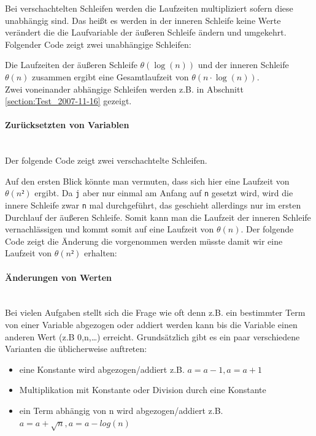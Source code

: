 \documentclass[a4paper, 12pt]{article}
\newcommand{\codeinput}[1]
{
    \begin{leftbar}
        
    \end{leftbar}
}
\begin{document}
Bei verschachtelten Schleifen werden die Laufzeiten multipliziert sofern diese
unabhängig sind. Das heißt es werden in der inneren Schleife keine Werte
verändert die die Laufvariable der äußeren Schleife ändern und umgekehrt.
Folgender Code zeigt zwei unabhängige Schleifen:

\codeinput{Independent_Loops}

Die Laufzeiten der äußeren Schleife $θ\left(\log\left(n\right)\right)$ und der
inneren Schleife $θ\left(n\right)$ zusammen ergibt eine Gesamtlaufzeit von
$θ\left( n⋅\log\left(n\right) \right)$.\\

Zwei voneinander abhängige Schleifen werden z.B. in Abschnitt
\ref{section:Test_2007-11-16} gezeigt.

\paragraph{Zurücksetzten von Variablen}~\\

Der folgende Code zeigt zwei verschachtelte Schleifen.

\codeinput{Two_Dependent_Loops}

Auf den ersten Blick könnte man vermuten, dass sich hier eine Laufzeit von
$θ\left(n²\right)$ ergibt. Da \texttt{j} aber nur einmal am Anfang auf
\texttt{n} gesetzt wird, wird die innere Schleife zwar \texttt{n} mal
durchgeführt, das geschieht allerdings nur im ersten Durchlauf der äußeren
Schleife. Somit kann man die Laufzeit der inneren Schleife vernachlässigen und
kommt somit auf eine Laufzeit von $θ\left(n\right)$. Der folgende Code zeigt
die Änderung die vorgenommen werden müsste damit wir eine Laufzeit von
$θ\left(n²\right)$ erhalten:

\codeinput{Two_Dependent_Loops_Quadratic}

\paragraph{Änderungen von Werten}~\\

Bei vielen Aufgaben stellt sich die Frage wie oft denn z.B. ein bestimmter
Term von einer Variable abgezogen oder addiert werden kann bis die Variable
einen anderen Wert (z.B 0,n,\dots) erreicht. Grundsätzlich gibt es ein paar
verschiedene Varianten die üblicherweise auftreten:

\begin{itemize}
	\item eine Konstante wird abgezogen/addiert z.B. $a=a-1, a=a+1$
	\item Multiplikation mit Konstante oder Division durch eine Konstante
	\item ein Term abhängig von n wird abgezogen/addiert z.B.\
	$a=a+\sqrt n, a=a-log\left(n\right)$
\end{itemize}
\end{document}
